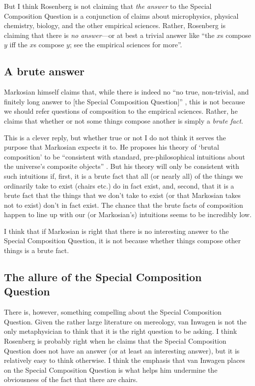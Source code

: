 \documentclass[11pt]{article}
\begin{document}
\begin{spacing}{1.5}
But I think Rosenberg is not claiming that {\em the answer} to the
Special Composition Question is a conjunction of claims about
microphysics, physical chemistry, biology, and the other empirical
sciences.  Rather, Rosenberg is claiming that there is {\em no
  answer}---or at best a trivial answer like ``the $x$s compose $y$
iff the $x$s compose $y$; see the empirical sciences for more''.

\subsection{A brute answer}
Markosian himself claims that, while there is indeed no ``no true,
non-trivial, and finitely long answer to [the Special Composition
  Question]'' \citeyearpar[214]{markosian1998a}, this is not because
we should refer questions of composition to the empirical sciences.
Rather, he claims that whether or not some things compose another is
simply a {\em brute fact}.

This is a clever reply, but whether true or not I do not think it
serves the purpose that Markosian expects it to.  He proposes his
theory of `brutal composition' to be ``consistent with standard,
pre-philosophical intuitions about the universe's composite objects''
\citeyearpar[211]{markosian1998a}.  But his theory will only be
consistent with such intuitions if, first, it is a brute fact that all
(or nearly all) of the things we ordinarily take to exist (chairs
etc.) do in fact exist, and, second, that it is a brute fact that the
things that we don't take to exist (or that Markosian takes not to
exist) don't in fact exist.  The chance that the brute facts of
composition happen to line up with our (or Markosian's) intuitions
seems to be incredibly low.

I think that if Markosian is right that there is no interesting answer
to the Special Composition Question, it is not because whether things
compose other things is a brute fact.

\subsection{The allure of the Special Composition Question}
There is, however, something compelling about the Special Composition
Question.  Given the rather large literature on mereology, van Inwagen
is not the only metaphysician to think that it is the right question
to be asking.  I think Rosenberg is probably right when he claims that
the Special Composition Question does not have an answer (or at least
an interesting answer), but it is relatively easy to think otherwise.
I think the emphasis that van Inwagen places on the Special
Composition Question is what helps him undermine the obviousness of
the fact that there are chairs.


\end{spacing}
\end{document}
